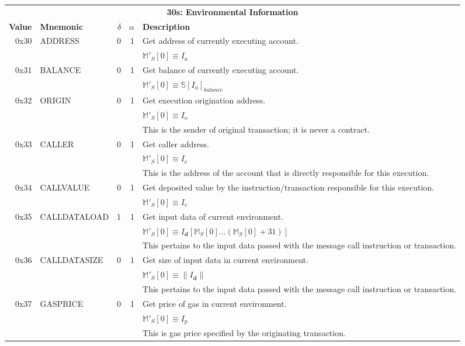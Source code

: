 \documentclass[9pt,oneside]{amsart}
\begin{document}
\begin{tabular*}{\columnwidth}[h]{rlrrl}
\toprule
\multicolumn{5}{c}{\textbf{30s: Environmental Information}} \vspace{5pt} \\
\textbf{Value} & \textbf{Mnemonic} & $\delta$ & $\alpha$ & \textbf{Description} \vspace{5pt} \\
0x30 & {\small ADDRESS} & 0 & 1 & Get address of currently executing account. \\
&&&& $\mathbb{M}'_S[0] \equiv I_a$ \\
\midrule
0x31 & {\small BALANCE} & 0 & 1 & Get balance of currently executing account. \\
&&&& $\mathbb{M}'_S[0] \equiv \mathbb{S}[I_a]_{balance}$ \\
\midrule
0x32 & {\small ORIGIN} & 0 & 1 & Get execution origination address. \\
&&&& $\mathbb{M}'_S[0] \equiv I_o$ \\
&&&& This is the sender of original transaction; it is never a contract. \\
\midrule
0x33 & {\small CALLER} & 0 & 1 & Get caller address. \\
&&&& $\mathbb{M}'_S[0] \equiv I_c$ \\
&&&& This is the address of the account that is directly responsible for this execution. \\
\midrule
0x34 & {\small CALLVALUE} & 0 & 1 & Get deposited value by the instruction/transaction responsible for this execution. \\
&&&& $\mathbb{M}'_S[0] \equiv I_v$ \\
\midrule
0x35 & {\small CALLDATALOAD} & 1 & 1 & Get input data of current environment. \\
&&&& $\mathbb{M}'_S[0] \equiv I_\mathbf{d}[ \mathbb{M}_S[0] \dots (\mathbb{M}_S[0] + 31) ]$ \\
&&&& This pertains to the input data passed with the message call instruction or transaction. \\
\midrule
0x36 & {\small CALLDATASIZE} & 0 & 1 & Get size of input data in current environment. \\
&&&& $\mathbb{M}'_S[0] \equiv \lVert I_\mathbf{d} \rVert$ \\
&&&& This pertains to the input data passed with the message call instruction or transaction. \\
\midrule
0x37 & {\small GASPRICE} & 0 & 1 & Get price of gas in current environment. \\
&&&& $\mathbb{M}'_S[0] \equiv I_p$ \\
&&&& This is gas price specified by the originating transaction.\\
\bottomrule
\end{tabular*}
\end{document}
